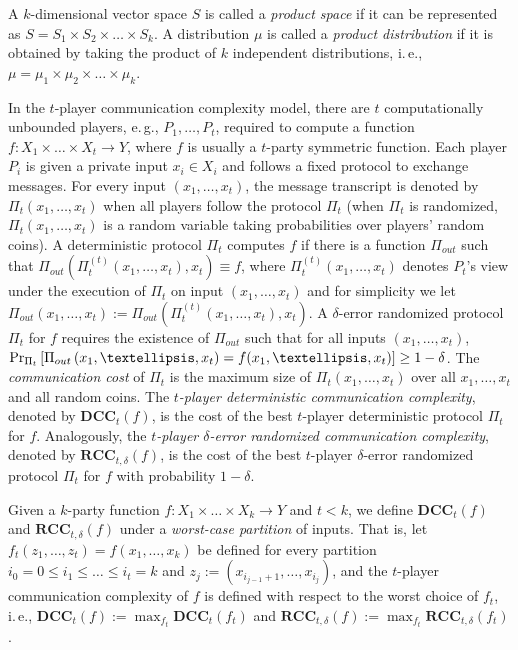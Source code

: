 \documentclass[11pt]{article}
\numberwithin{equation}{section}
\theoremstyle{definition}
\theoremstyle{plain}
\newcommand{\ie}{i.\,e.}
\newcommand{\eg}{e.\,g.}
\newcommand{\error}{\ensuremath{\delta}}
\newcommand{\eqdef}{\ensuremath{:=}}
\newcommand{\dcc}{\ensuremath{\mathbf{DCC}}}
\newcommand{\rcc}{\ensuremath{\mathbf{RCC}}}
\begin{document}
	A $k$-dimensional vector space $S$ is called a \emph{product space} if it can be represented as $S=S_1\times S_2 \times\dots\times S_k$.
	A distribution $\mu$ is called a \emph{product distribution} if it is obtained by taking the product of $k$ independent distributions, \ie, $\mu=\mu_1\times \mu_2 \times \dots \times \mu_k$.

In the $t$-player communication complexity model, there are $t$ computationally unbounded players, \eg, $P_1,\dots,P_t$, required to compute a function $f:X_1\times\dots\times X_t\to Y$, where $f$ is usually a $t$-party symmetric function.
Each player $P_i$ is given a private input $x_i\in X_i$ and follows a fixed protocol to exchange messages.
For every input $(x_1,\dots,x_t)$, the message transcript is denoted by $\Pi_t(x_1,\dots,x_t)$ when all players follow the protocol $\Pi_t$
(when $\Pi_t$ is randomized, $\Pi_t(x_1,\dots,x_t)$ is a random variable taking probabilities over players' random coins).
A deterministic protocol $\Pi_t$ computes $f$ if there is a function $\Pi_{out}$ such that $\Pi_{out}\left(\Pi_t^{(t)}(x_1,\dots,x_t), x_t\right) \equiv f$,
where $\Pi_t^{(t)}(x_1,\dots,x_t)$ denotes $P_t$'s view under the execution of $\Pi_t$ on input $(x_1,\dots,x_t)$ and for simplicity we let $\Pi_{out}\left(x_1,\dots,x_t\right)\eqdef \Pi_{out}\left(\Pi_t^{(t)}(x_1,\dots,x_t), x_t\right)$.
A $\error$-error randomized protocol $\Pi_t$ for $f$ requires the existence of $\Pi_{out}$ such that for all inputs $(x_1,\dots,x_t)$, $\Pr_{{\color{black}\Pi_t}}\left[ \Pi_{out}\left(x_1,\dots,x_t\right)=f(x_1,\dots,x_t) \right]\ge 1-\error$.
The \emph{communication cost} of $\Pi_t$ is the maximum size of $\Pi_t(x_1,\dots,x_t)$ over all $x_1,\dots,x_t$ and all random coins.
%
%
%
%
%
%
%
%
%
%
%
The \emph{$t$-player deterministic communication complexity},
denoted by $\dcc_t(f)$, is the cost of the 
best $t$-player deterministic protocol 
$\Pi_t$ for $f$.  Analogously, the
\emph{$t$-player $\error$-error randomized communication complexity},
denoted by $\rcc_{t,\error}(f)$, is the cost of the 
best $t$-player $\error$-error randomized protocol 
$\Pi_t$ for $f$ with probability $1-\delta$.    %
%

Given a $k$-party function $f:X_1\times \dots\times X_k\to Y$ and $t<k$, 
we define $\dcc_t(f)$ and $\rcc_{t,\error}(f)$ 
under a \emph{worst-case partition} of inputs.
That is, let $f_t(z_1,\dots,z_t)=f(x_1,\dots,x_k)$ be defined for every partition $i_0=0\le i_1 \le \dots \le i_t=k$ and $z_j\eqdef (x_{i_{j-1}+1},\dots,x_{i_j})$,
and the $t$-player communication complexity of $f$ is defined with respect to the worst choice of $f_t$, \ie,  
$\dcc_t(f)\eqdef\max_{f_t}\dcc_t(f_t)$ and $\rcc_{t,\error}(f)\eqdef \max_{f_t}\rcc_{t,\error}(f_t)$.
\end{document}
